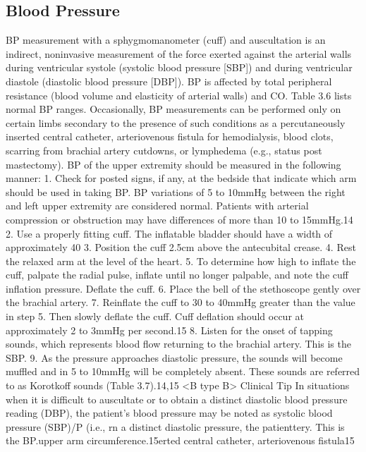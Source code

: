 \subsection{Blood Pressure}
BP measurement with a sphygmomanometer (cuff) and auscultation is an indirect, noninvasive measurement of the force exerted against the arterial walls during ventricular systole (systolic blood pressure [SBP]) and during ventricular diastole (diastolic blood pressure [DBP]). BP is affected by total peripheral resistance (blood volume and elasticity of arterial walls) and CO. Table 3.6 lists normal BP ranges. Occasionally, BP measurements can be performed only on certain limbs secondary to the presence of such conditions as a percutaneously inserted central catheter, arteriovenous fistula for hemodialysis, blood clots, scarring from brachial artery cutdowns, or lymphedema (e.g., status post mastectomy). BP of the upper extremity should be measured in the following manner:
1. Check for posted signs, if any, at the bedside that indicate which arm should be used in taking BP. BP variations of 5 to 10mmHg between the right and left upper extremity are considered normal. Patients with arterial compression or obstruction may have differences of more than 10 to 15mmHg.14
2. Use a properly fitting cuff. The inflatable bladder should have a width of approximately 40%
3. Position the cuff 2.5cm above the antecubital crease.
4. Rest the relaxed arm at the level of the heart.
5. To determine how high to inflate the cuff, palpate the radial pulse, inflate until no longer palpable, and note the cuff inflation pressure. Deflate the cuff.
6. Place the bell of the stethoscope gently over the brachial artery.
7. Reinflate the cuff to 30 to 40mmHg greater than the value in step 5. Then slowly deflate the cuff. Cuff deflation should occur at approximately 2 to 3mmHg per second.15
8. Listen for the onset of tapping sounds, which represents blood flow returning to the brachial artery. This is the SBP.
9. As the pressure approaches diastolic pressure, the sounds will become muffled and in 5 to 10mmHg will be completely absent. These sounds are referred to as Korotkoff sounds (Table 3.7).14,15
<B type B>
Clinical Tip
In situations when it is difficult to auscultate or to obtain a distinct diastolic blood pressure reading (DBP), the patient’s blood pressure may be noted as systolic blood pressure (SBP)/P (i.e., rn a distinct diastolic pressure, the patienttery. This is the BP.upper arm circumference.15erted central catheter, arteriovenous fistula15
